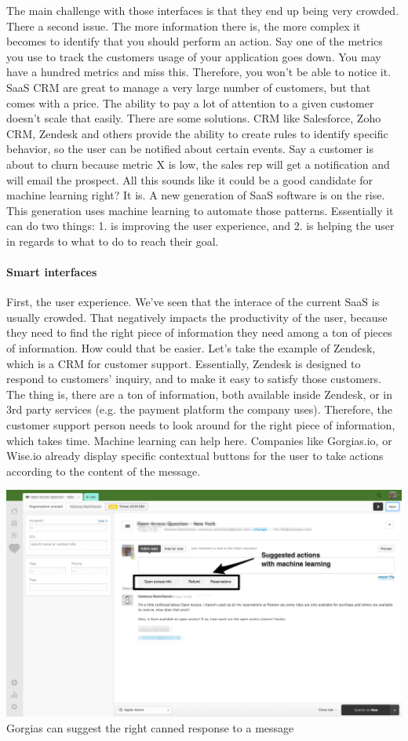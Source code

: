 \documentclass[12pt]{article}
\begin{document}
The main challenge with those interfaces is that they end up being very crowded. There a second issue. The more information there is, the more complex it becomes to identify that you should perform an action. Say one of the metrics you use to track the customers usage of your application goes down. You may have a hundred metrics and miss this. Therefore, you won't be able to notice it.
SaaS CRM are great to manage a very large number of customers, but that comes with a price. The ability to pay a lot of attention to a given customer doesn't scale that easily.
There are some solutions. CRM like Salesforce, Zoho CRM, Zendesk and others provide the ability to create rules to identify specific behavior, so the user can be notified about certain events. Say a customer is about to churn because metric X is low, the sales rep will get a notification and will email the prospect.
All this sounds like it could be a good candidate for machine learning right? It is. A new generation of SaaS software is on the rise. This generation uses machine learning to automate those patterns. Essentially it can do two things: 1. is improving the user experience, and 2. is helping the user in regards to what to do to reach their goal.

\paragraph{Smart interfaces}

First, the user experience. We've seen that the interace of the current SaaS is usually crowded. That negatively impacts the productivity of the user, because they need to find the right piece of information they need among a ton of pieces of information. How could that be easier. Let's take the example of Zendesk, which is a CRM for customer support. Essentially, Zendesk is designed to respond to customers' inquiry, and to make it easy to satisfy those customers. The thing is, there are a ton of information, both available inside Zendesk, or in 3rd party services (e.g. the payment platform the company uses). Therefore, the customer support person needs to look around for the right piece of information, which takes time. Machine learning can help here. Companies like Gorgias.io, or Wise.io already display specific contextual buttons for the user to take actions according to the content of the message.

\smallskip
\includegraphics[width=\textwidth]{zendesk}
Gorgias can suggest the right canned response to a message
\smallskip
\end{document}
